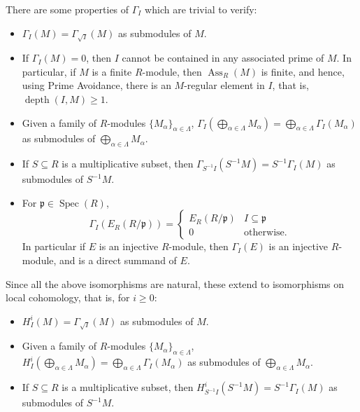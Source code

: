 \documentclass[10pt]{article}
\theoremstyle{thmstyle}
\theoremstyle{defstyle}
\newcommand{\Spec}{\operatorname{Spec}}
\newcommand{\frakp}{\mathfrak{p}} %
\renewcommand{\ge}{\geqslant}
\newcommand{\Ass}{\operatorname{Ass}}
\newcommand{\depth}{\operatorname{depth}}
\begin{document}
There are some properties of $\Gamma_I$ which are trivial to verify: 
\begin{itemize}
	\item $\Gamma_I(M) = \Gamma_{\sqrt I}(M)$ as submodules of $M$. 
	\item If $\Gamma_I(M) = 0$, then $I$ cannot be contained in any associated prime of $M$. In particular, if $M$ is a finite $R$-module, then $\Ass_R(M)$ is finite, and hence, using Prime Avoidance, there is an $M$-regular element in $I$, that is, $\depth(I, M)\ge 1$.
	\item Given a family of $R$-modules $\{M_\alpha\}_{\alpha\in\Lambda}$, $\Gamma_I\left(\bigoplus\limits_{\alpha\in\Lambda} M_\alpha\right) = \bigoplus\limits_{\alpha\in\Lambda}\Gamma_I(M_\alpha)$ as submodules of $\bigoplus\limits_{\alpha\in\Lambda} M_\alpha$.
	\item If $S\subseteq R$ is a multiplicative subset, then $\Gamma_{S^{-1}I}(S^{-1}M) = S^{-1}\Gamma_I(M)$ as submodules of $S^{-1}M$.
	\item For $\frakp\in\Spec(R)$, 
	\begin{equation*}
		\Gamma_I\left(E_R(R/\frakp)\right) = 
		\begin{cases}
			E_R(R/\frakp) & I\subseteq\frakp\\
			0 & \text{otherwise}.
		\end{cases}
	\end{equation*}
	In particular if $E$ is an injective $R$-module, then $\Gamma_I(E)$ is an injective $R$-module, and is a direct summand of $E$.
\end{itemize}
Since all the above isomorphisms are natural, these extend to isomorphisms on local cohomology, that is, for $i\ge 0$:
\begin{itemize}
	\item $H^i_I(M) = \Gamma_{\sqrt I}(M)$ as submodules of $M$. 
	\item Given a family of $R$-modules $\{M_\alpha\}_{\alpha\in\Lambda}$, $H^i_I\left(\bigoplus\limits_{\alpha\in\Lambda} M_\alpha\right) = \bigoplus\limits_{\alpha\in\Lambda}\Gamma_I(M_\alpha)$ as submodules of $\bigoplus\limits_{\alpha\in\Lambda} M_\alpha$.
	\item If $S\subseteq R$ is a multiplicative subset, then $H^i_{S^{-1}I}(S^{-1}M) = S^{-1}\Gamma_I(M)$ as submodules of $S^{-1}M$.
\end{itemize}
\end{document}
